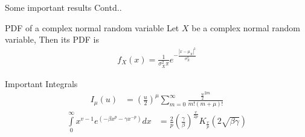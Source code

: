 \documentclass{beamer}
\providecommand{\brak}[1]{\ensuremath{\left(#1\right)}}
\begin{document}
\begin{frame}{Some important results Contd..}
    \begin{block}{PDF of a complex normal random variable}
    Let $X$ be a complex normal random variable, Then its PDF is 
    \begin{align}
        f_X(x)=\frac{1}{\sigma_X^2\pi}e^{-\frac{|{x-\mu_X}|^2}{\sigma_X^2}}\label{6}
    \end{align}
    \end{block}
     \begin{block}{Important Integrals}
    \begin{align}
        I_{\mu}({u})&=\brak{\frac{u}{2}}^{\mu}\sum\limits_{m=0}^{\infty}\frac{{\frac{u}{2}}^{2m}}{m!(m+\mu)!}\label{I_1}
    \end{align}
    \begin{align}
        \int\limits_0^{\infty} x^{v-1} e^{\brak{-\beta x^ p -\gamma x^{-p}}} dx &= \frac{2}{p}\brak{\frac{\gamma}{\beta}}^{\frac{v}{2p}} K_{\frac{v}{p}}\brak{2\sqrt{\beta\gamma}}\label{I_2}
    \end{align}
    \end{block}
\end{frame}
\end{document}
